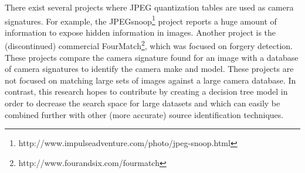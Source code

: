 There exist several projects where JPEG quantization tables are used as camera signatures. For example, the JPEGsnoop\footnote{http://www.impulseadventure.com/photo/jpeg-snoop.html} project reports a huge amount of information to expose hidden information in images. Another project is the (discontinued) commercial FourMatch\footnote{http://www.fourandsix.com/fourmatch}, which was focused on forgery detection. These projects compare the camera signature found for an image with a database of camera signatures to identify the camera make and model. These projects are not focused on matching large sets of images against a large camera database. In contrast, this research hopes to contribute by creating a decision tree model in order to decrease the search space for large datasets and which can easily be combined further with other (more accurate) source identification techniques. 